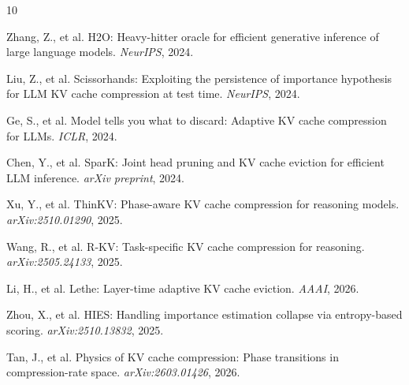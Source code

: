\documentclass[11pt,a4paper]{article}
\begin{document}

\begin{thebibliography}{10}

Zhang, Z., et al.
\newblock H2O: Heavy-hitter oracle for efficient generative inference of large language models.
\newblock \emph{NeurIPS}, 2024.

Liu, Z., et al.
\newblock Scissorhands: Exploiting the persistence of importance hypothesis for LLM KV cache compression at test time.
\newblock \emph{NeurIPS}, 2024.

Ge, S., et al.
\newblock Model tells you what to discard: Adaptive KV cache compression for LLMs.
\newblock \emph{ICLR}, 2024.

Chen, Y., et al.
\newblock SparK: Joint head pruning and KV cache eviction for efficient LLM inference.
\newblock \emph{arXiv preprint}, 2024.

Xu, Y., et al.
\newblock ThinKV: Phase-aware KV cache compression for reasoning models.
\newblock \emph{arXiv:2510.01290}, 2025.

Wang, R., et al.
\newblock R-KV: Task-specific KV cache compression for reasoning.
\newblock \emph{arXiv:2505.24133}, 2025.

Li, H., et al.
\newblock Lethe: Layer-time adaptive KV cache eviction.
\newblock \emph{AAAI}, 2026.

Zhou, X., et al.
\newblock HIES: Handling importance estimation collapse via entropy-based scoring.
\newblock \emph{arXiv:2510.13832}, 2025.

Tan, J., et al.
\newblock Physics of KV cache compression: Phase transitions in compression-rate space.
\newblock \emph{arXiv:2603.01426}, 2026.

\end{thebibliography}
\end{document}
